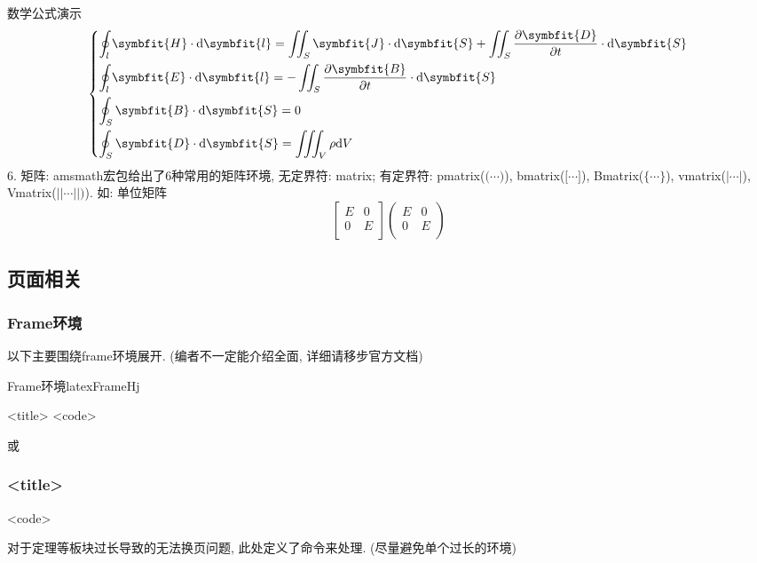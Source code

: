 \documentclass[hyperref,UTF8,11pt]{beamer}
\begin{document}
\begin{frame}{数学公式演示}
\begin{equation}
\begin{dcases}
			\oint_l \symbfit{H} \cdot \mathrm{d}\symbfit{l} = \iint_S \symbfit{J} \cdot \mathrm{d}\symbfit{S} + \iint_S \dfrac{\partial\symbfit{D}}{\partial t} \cdot \mathrm{d}\symbfit{S} \\
			\oint_l \symbfit{E} \cdot \mathrm{d}\symbfit{l} = - \iint_S \dfrac{\partial\symbfit{B}}{\partial t} \cdot \mathrm{d}\symbfit{S} \\
			\oint_S \symbfit{B} \cdot \mathrm{d}\symbfit{S} = 0 \\
			\oint_S \symbfit{D} \cdot \mathrm{d}\symbfit{S} = \iiint_V \rho \mathrm{d}V
			\end{dcases}
		\end{equation}
	{\color{JXred}6. 矩阵:} amsmath宏包给出了6种常用的矩阵环境, 无定界符: {\color{JXred}matrix}; 有定界符: {\color{JXred}pmatrix}($\big(\cdots\big)$), {\color{JXred}bmatrix}($\big[\cdots\big]$), {\color{JXred}Bmatrix}($\bigl\{\cdots\bigr\}$), {\color{JXred}vmatrix}($|\cdots|$), {\color{JXred}Vmatrix}($||\cdots||)$).
	如: 单位矩阵
		\[
		\begin{bmatrix}
		E & 0 \\
		0 & E \\
		\end{bmatrix}
		\begin{pmatrix}
			E & 0 \\
			0 & E \\
		\end{pmatrix}
		\]
\end{frame}

\subsection{页面相关}
\cprotEnv\begin{frame}
	\frametitle{Frame环境}
	以下主要围绕frame环境展开. (编者不一定能介绍全面, 详细请移步官方文档)
	\begin{SCUshow}[comment={%
			\scriptsize%
			{\color{JXred}<keys>}\quad frame环境选项\\
			~~常用选项: {\color{BSblue}fragile}: 保护脆弱命令(如代码, 抄录环境需此项)\\
			~~{\color{BSblue}allowframebreaks(=?)}: 允许内容过多时自动切帧(括号中省略即自动判断). 注: 使用\texttt{pagebreak}或\texttt{framebreak}命令可实现手动位置切帧换页, 但会在一些时候失效(不知道为什么, 得看源码)\\
			~~{\color{BSblue}t}: 在页面顶部(默认居中)\\
			{\color{JXred}<title>}\quad 标题\\
		},%
		listing side comment]{Frame环境}{latex}{}{FrameHj}
		\begin{frame}[<keys>]{<title>}
			<code>
		\end{frame}
		或
		\begin{frame}[<keys>]
			\frametitle{<title>}
			<code>
		\end{frame}
	\end{SCUshow}
	对于定理等板块过长导致的无法换页问题, 此处定义了命令来处理. (尽量避免单个过长的环境)
\end{frame}
\end{document}
